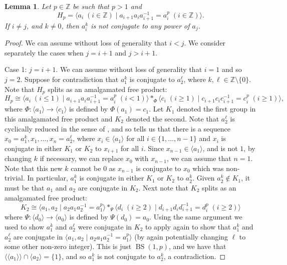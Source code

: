 \documentclass[11pt]{amsart}
\newtheorem{lem}[theorem]{Lemma}
\theoremstyle{definition}
\numberwithin{theorem}{section}
\DeclareMathOperator{\BS}{BS}
\newcommand{\Z}{\mathbb{Z}}
\begin{document}
\begin{lem}
	\label{not-conj}
	Let \(p \in \Z\) be such that \(p > 1\) and
	\[
	 H_p = 
			\langle a_i \; (i \in \Z) \mid a_{i + 1} a_i
	a_{i + 1}^{-1} = a_i^p \; (i \in \Z)\rangle.
	\]
	If \(i \neq j\), and \(k \neq 0\), then \(a_i^k\) is not conjugate to any
	power of \(a_j\).
\end{lem}

\begin{proof}
	We can assume without loss of generality that \(i < j\). We consider
	separately the cases when \(j = i + 1\) and \(j > i + 1\).

	Case 1: \(j = i + 1\). We can assume without loss of generality that \(i =
	1\) and so \(j = 2\). Suppose for contradiction that \(a_1^k\) is conjugate
	to \(a_2^\ell\), where \(k, \ell \in \Z \setminus \{0\}\). Note that
	\(H_p\) splits as an amalgamated free product:
	\[
		H_p \cong \langle a_i \; (i \leq 1) \mid a_{i + 1} a_i a_{i + 1}^{-1} = a_i^p 
		\; (i < 1) \rangle \ast_{\Phi} 
		\langle c_i \; (i \geq 1) \mid c_{i + 1} c_i c_{i + 1}^{-1} = c_i^p
		\; (i \geq 1) \rangle,
	\]
	where \(\Phi \colon \langle a_1 \rangle \to \langle c_1 \rangle\) is
	defined by \(\Phi(a_1) = c_1\). Let \(K_1\) denoted the first group in this
	amalgamated free product and \(K_2\) denoted the second. Note that
	\(a_2^\ell\) is cyclically reduced in the sense of \cite[Theorem
	4.6]{MagnusKarrassSolitar}, and so \cite[Theorem
	4.6(i)]{MagnusKarrassSolitar} tells us that there is a sequence \(x_0 =
	a_1^k, x_1, \ldots, x_n = a_2^\ell\), where \(x_i \in \langle a_1 \rangle\)
	for all \(i \in \{1, \ldots, n - 1\}\) and \(x_i\) is conjugate in either
	\(K_1\) or \(K_2\) to \(x_{i + 1}\) for all \(i\). Since \(x_{n - 1} \in
	\langle a_1 \rangle\), and is not \(1\), by changing \(k\) if necessary, we
	can replace \(x_0\) with \(x_{n - 1}\), we can assume that \(n = 1\). Note
	that this new \(k\) cannot be \(0\) as \(x_{n - 1}\) is conjugate to
	\(x_0\) which was non-trivial. In particular, \(a_1^k\) is conjugate in
	either \(K_1\) or \(K_2\) to \(a_2^k\). Given \(a_2^k \notin K_1\), it must
	be that \(a_1\) and \(a_2\) are conjugate in \(K_2\).
	Next note that \(K_2\) splits as an amalgamated free product:
	\[
		K_2 \cong 
		\langle a_1, a_2 \mid a_2 a_1 a_2^{-1} = a_1^p \rangle \ast_{\Psi}
		\langle d_i \; (i \geq 2) \mid d_{i + 1} d_i d_{i + 1}^{-1} = d_i^p 
		\; (i \geq 2) \rangle
	\]
	where \(\Psi \colon \langle d_0 \rangle \to \langle a_0 \rangle\) is
	defined by \(\Psi(d_0) = a_0\). Using the same argument we used to show
	\(a_1^k\) and \(a_2^\ell\) were conjugate in \(K_2\) to apply \cite[Theorem
	4.6(i)]{MagnusKarrassSolitar} again to show that \(a_1^k\) and \(a_2^\ell\)
	are conjugate in \(\langle a_1, a_2 \mid a_2 a_1 a_2^{-1} = a_1^p \rangle\)
	(by again potentially changing \(\ell\) to some other non-zero integer).
	This is just \(\BS(1, p)\), and we have that \(\langle \langle a_1 \rangle
	\rangle \cap \langle a_2 \rangle = \{1\}\), and so \(a_1^k\) is not
	conjugate to \(a_2^k\), a contradiction.


\end{proof}
\end{document}
